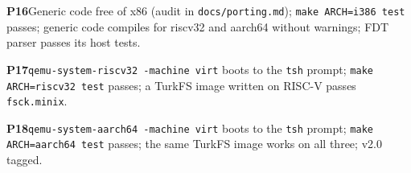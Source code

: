 \documentclass[11pt,a4paper]{article}
\begin{document}
\begin{checklist}
  \item \textbf{P16}\enspace Generic code free of x86 (audit in \texttt{docs/porting.md}); \texttt{make ARCH=i386 test} passes; generic code compiles for riscv32 and aarch64 without warnings; FDT parser passes its host tests.
  \item \textbf{P17}\enspace \texttt{qemu-system-riscv32 -machine virt} boots to the \texttt{tsh} prompt; \texttt{make ARCH=riscv32 test} passes; a TurkFS image written on RISC-V passes \texttt{fsck.minix}.
  \item \textbf{P18}\enspace \texttt{qemu-system-aarch64 -machine virt} boots to the \texttt{tsh} prompt; \texttt{make ARCH=aarch64 test} passes; the same TurkFS image works on all three; v2.0 tagged.
\end{checklist}

\booklegend
\portlegend
\end{document}
